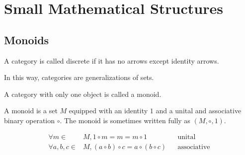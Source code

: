 \section{Small Mathematical Structures}
\subsection{Monoids}
\begin{definition}
    A category is called discrete if it has no arrows except identity arrows.
\end{definition}
In this way, categories are generalizations of sets.
\begin{definition}
    A category with only one object is called a monoid.
\end{definition}
\begin{definition}
    A monoid is a set $M$ equipped with an identity $1$ and a unital and associative
binary operation $\circ$. The monoid is sometimes written fully as $(M, \circ,
1)$.
\end{definition}
\begin{align*}
    \forall m \in& M, 1\circ m = m = m \circ 1&&\text{unital}\\
    \forall a, b, c \in& M, (a\circ b)\circ c = a \circ (b \circ
    c)&&\text{associative}
\end{align*}

